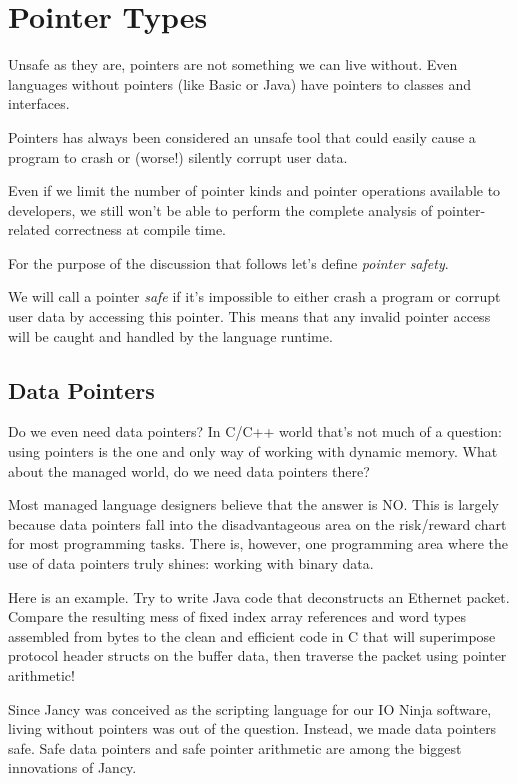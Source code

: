 \documentclass[oneside]{book}
\begin{document}
\section{Pointer Types}

Unsafe as they are, pointers are not something we can live without. Even languages without pointers (like Basic or Java) have pointers to classes and interfaces.

Pointers has always been considered an unsafe tool that could easily cause a program to crash or (worse!) silently corrupt user data.

Even if we limit the number of pointer kinds and pointer operations available to developers, we still won't be able to perform the complete analysis of pointer-related correctness at compile time.

For the purpose of the discussion that follows let's define \emph{pointer safety}.

We will call a pointer \emph{safe} if it's impossible to either crash a program or corrupt user data by accessing this pointer. This means that any invalid pointer access will be caught and handled by the language runtime.

\subsection{Data Pointers}

Do we even need data pointers? In C/C++ world that's not much of a question: using pointers is the one and only way of working with dynamic memory. What about the managed world, do we need data pointers there?

Most managed language designers believe that the answer is NO. This is largely because data pointers fall into the disadvantageous area on the risk/reward chart for most programming tasks. There is, however, one programming area where the use of data pointers truly shines: working with binary data.

Here is an example. Try to write Java code that deconstructs an Ethernet packet. Compare the resulting mess of fixed index array references and word types assembled from bytes to the clean and efficient code in C that will superimpose protocol header structs on the buffer data, then traverse the packet using pointer arithmetic!

Since Jancy was conceived as the scripting language for our IO Ninja software, living without pointers was out of the question. Instead, we made data pointers safe. Safe data pointers and safe pointer arithmetic are among the biggest innovations of Jancy.
\end{document}
